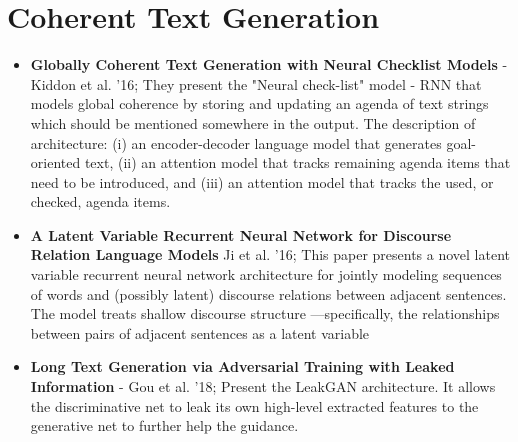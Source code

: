 \section{Coherent Text Generation}
\begin{itemize}
\item \textbf{Globally Coherent Text Generation with Neural Checklist Models} - Kiddon et al. '16; They present the "Neural check-list" model - RNN that models global coherence by storing and updating an agenda of text strings which should be mentioned somewhere in the output. The description of architecture: (i) an encoder-decoder language model that generates goal-oriented text, (ii) an attention model that tracks remaining agenda items that need to be introduced, and (iii) an attention model that tracks the used, or checked, agenda items.

\item \textbf{A Latent Variable Recurrent Neural Network
for Discourse Relation Language Models} Ji et al. '16; This paper presents a novel latent variable recurrent neural network architecture for jointly
modeling sequences of words and (possibly latent) discourse relations between adjacent sentences. The model treats shallow discourse structure —specifically, the relationships between pairs of adjacent sentences as a latent variable 


\item \textbf{Long Text Generation via Adversarial
Training with Leaked Information} - Gou et al. '18; Present the LeakGAN architecture. It allows the discriminative net to leak its own high-level extracted features to the generative net to further help the guidance. 



\end{itemize}

